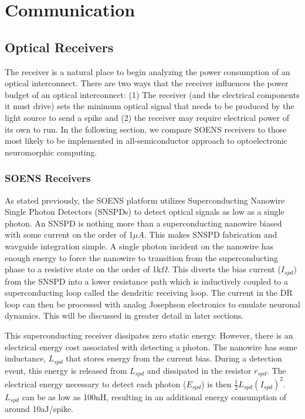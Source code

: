 \documentclass[twocolumn]{article}
\begin{document}
\section{\label{sec:communication}Communication}
\subsection{Optical Receivers}
\quad \quad The receiver is a natural place to begin analyzing the power consumption of an optical interconnect. There are two ways that the receiver influences the power budget of an optical interconnect: (1) The receiver (and the electrical components it must drive) sets the minimum optical signal that needs to be produced by the light source to send a spike and (2) the receiver may require electrical power of its own to run. In the following section, we compare SOENS receivers \cite{shainline2019superconducting} to those most likely to be implemented in all-semiconductor approach to optoelectronic neuromorphic computing.

\subsubsection{SOENS Receivers}
\quad \quad As stated previously, the SOENS platform utilizes Superconducting Nanowire Single Photon Detectors (SNSPDs) to detect optical signals as low as a single photon. An SNSPD is nothing more than a superconducting nanowire biased with some current on the order of 1$\mu A$. This makes SNSPD fabrication and wavguide integration simple. A single photon incident on the nanowire has enough energy to force the nanowire to transition from the superconducting phase to a resistive state on the order of 1k$\Omega$. This diverts the bias current ($I_{spd}$) from the SNSPD into a lower resistance path which is inductively coupled to a superconducting loop called the dendritic receiving loop. The current in the DR loop can then be processed with analog Josephson electronics to emulate neuronal dynamics. This will be discussed in greater detail in later sections.

This superconducting receiver dissipates zero static energy. However, there is an electrical energy cost associated with detecting a photon. The nanowire has some inductance, $L_{spd}$ that stores energy from the current bias. During a detection event, this energy is released from $L_{spd}$ and dissipated in the resistor $r_{spd}$. The electrical energy necessary to detect each photon ($E_{spd}$) is then $\frac{1}{2}L_{spd}(I_{spd})^2$. $L_{spd}$ can be as low as 100nH, resulting in an additional energy consumption of around 10aJ/spike.
\end{document}
